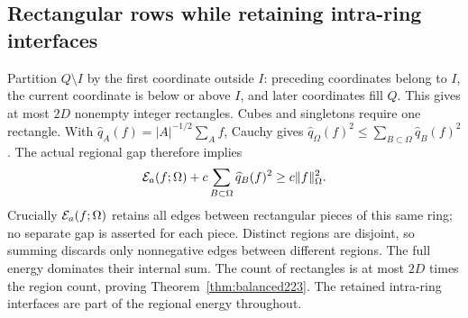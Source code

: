 \subsection{Rectangular rows while retaining intra-ring interfaces}
Partition $Q\setminus I$ by the first coordinate outside $I$: preceding
coordinates belong to $I$, the current coordinate is below or above $I$,
and later coordinates fill $Q$. This gives at most $2D$ nonempty integer
rectangles. Cubes and singletons require one rectangle. With
$\widehat q_A(f)=|A|^{-1/2}\sum_A f$, Cauchy gives
$\widehat q_\Omega(f)^2\le\sum_{B\subset\Omega}\widehat q_B(f)^2$.
The actual regional gap therefore implies
\[
 \mathcal E_a(f;\Omega)+c\sum_{B\subset\Omega}\widehat q_B(f)^2\ge c\|f\|_\Omega^2.
\]
Crucially $\mathcal E_a(f;\Omega)$ retains all edges between rectangular pieces
of this same ring; no separate gap is asserted for each piece.
Distinct regions are disjoint, so summing discards only nonnegative edges
between different regions. The full energy dominates their internal sum.
The count of rectangles is at most $2D$ times the region count, proving
Theorem~\ref{thm:balanced223}. The retained intra-ring interfaces are part of the regional energy throughout.

